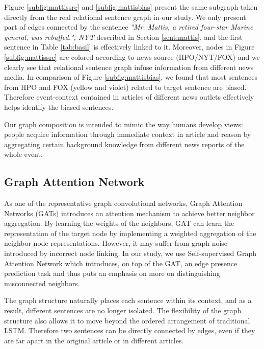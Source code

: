 \documentclass[letterpaper]{article} %
\begin{document}
Figure \ref{subfig:mattissrc} and \ref{subfig:mattisbias} present the same subgraph taken directly from the real relational sentence graph in our study. We only present part of edges connected by the sentence \textit{"Mr. Mattis, a retired four-star Marine general, was rebuffed.", NYT} described in Section \ref{sent:mattis}, and the first sentence in Table \ref{tab:basil} is effectively linked to it. Moreover, nodes in Figure \ref{subfig:mattissrc} are colored according to news source (HPO/NYT/FOX) and we clearly see that relational sentence graph infuse information from different news media. In comparison of Figure \ref{subfig:mattisbias}, we found that most sentences from HPO and FOX (yellow and violet) related to target sentence are biased. Therefore event-context contained in articles of different news outlets effectively helps identify the biased sentences.

Our graph composition is intended to mimic the way humans develop views: people acquire information through immediate context in article and reason by aggregating certain background knowledge from different news reports of the whole event.

\subsection{Graph Attention Network}

As one of the representative graph convolutional networks, Graph Attention Networks (GATs) introduces an attention mechanism to achieve better neighbor aggregation. By learning the weights of the neighbors, GAT can learn the representation of the target node by implementing a weighted aggregation of the neighbor node representations. However, it may suffer from graph noise introduced by incorrect node linking. In our study, we use Self-supervised Graph Attention Network \citet{kim2021how} which introduces, on top of the GAT, an edge presence prediction task and  thus puts an emphasis on more on distinguishing misconnected neighbors.

The graph structure naturally places each sentence within its context, and as a result, different sentences are no longer isolated. The flexibility of the graph structure also allows it to move beyond the ordered arrangement of traditional LSTM. Therefore two sentences can be directly connected by edges, even if they are far apart in the original article or in different articles. 
\end{document}
